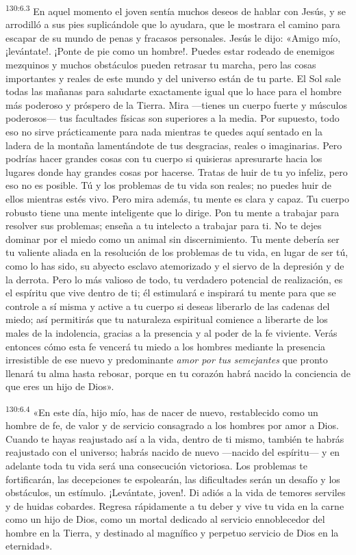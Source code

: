 \par
\textsuperscript{130:6.3} En aquel momento el joven sentía muchos deseos de hablar con Jesús, y se arrodilló a sus pies suplicándole que lo ayudara, que le mostrara el camino para escapar de su mundo de penas y fracasos personales. Jesús le dijo: «Amigo mío, ¡levántate!. ¡Ponte de pie como un hombre!. Puedes estar rodeado de enemigos mezquinos y muchos obstáculos pueden retrasar tu marcha, pero las cosas importantes y reales de este mundo y del universo están de tu parte. El Sol sale todas las mañanas para saludarte exactamente igual que lo hace para el hombre más poderoso y próspero de la Tierra. Mira ---tienes un cuerpo fuerte y músculos poderosos--- tus facultades físicas son superiores a la media. Por supuesto, todo eso no sirve prácticamente para nada mientras te quedes aquí sentado en la ladera de la montaña lamentándote de tus desgracias, reales o imaginarias. Pero podrías hacer grandes cosas con tu cuerpo si quisieras apresurarte hacia los lugares donde hay grandes cosas por hacerse. Tratas de huir de tu yo infeliz, pero eso no es posible. Tú y los problemas de tu vida son reales; no puedes huir de ellos mientras estés vivo. Pero mira además, tu mente es clara y capaz. Tu cuerpo robusto tiene una mente inteligente que lo dirige. Pon tu mente a trabajar para resolver sus problemas; enseña a tu intelecto a trabajar para ti. No te dejes dominar por el miedo como un animal sin discernimiento. Tu mente debería ser tu valiente aliada en la resolución de los problemas de tu vida, en lugar de ser tú, como lo has sido, su abyecto esclavo atemorizado y el siervo de la depresión y de la derrota. Pero lo más valioso de todo, tu verdadero potencial de realización, es el espíritu que vive dentro de ti; él estimulará e inspirará tu mente para que se controle a sí misma y active a tu cuerpo si deseas liberarlo de las cadenas del miedo; así permitirás que tu naturaleza espiritual comience a liberarte de los males de la indolencia, gracias a la presencia y al poder de la fe viviente. Verás entonces cómo esta fe vencerá tu miedo a los hombres mediante la presencia irresistible de ese nuevo y predominante \textit{amor por tus semejantes} que pronto llenará tu alma hasta rebosar, porque en tu corazón habrá nacido la conciencia de que eres un hijo de Dios».

\par
\textsuperscript{130:6.4} «En este día, hijo mío, has de nacer de nuevo, restablecido como un hombre de fe, de valor y de servicio consagrado a los hombres por amor a Dios. Cuando te hayas reajustado así a la vida, dentro de ti mismo, también te habrás reajustado con el universo; habrás nacido de nuevo ---nacido del espíritu--- y en adelante toda tu vida será una consecución victoriosa. Los problemas te fortificarán, las decepciones te espolearán, las dificultades serán un desafío y los obstáculos, un estímulo. ¡Levántate, joven!. Di adiós a la vida de temores serviles y de huidas cobardes. Regresa rápidamente a tu deber y vive tu vida en la carne como un hijo de Dios, como un mortal dedicado al servicio ennoblecedor del hombre en la Tierra, y destinado al magnífico y perpetuo servicio de Dios en la eternidad».

